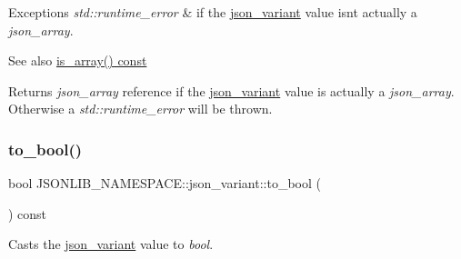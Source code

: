 \begin{DoxyExceptions}{Exceptions}
{\em std\+::runtime\+\_\+error} & if the \hyperlink{classJSONLIB__NAMESPACE_1_1json__variant}{json\+\_\+variant} value isn\textquotesingle{}t actually a {\itshape json\+\_\+array}. \\
\hline
\end{DoxyExceptions}
\begin{DoxySeeAlso}{See also}
\hyperlink{classJSONLIB__NAMESPACE_1_1json__variant_a72349dff71a411ac24eea6d943772df7}{is\+\_\+array() const} 
\end{DoxySeeAlso}
\begin{DoxyReturn}{Returns}
{\itshape json\+\_\+array} reference if the \hyperlink{classJSONLIB__NAMESPACE_1_1json__variant}{json\+\_\+variant} value is actually a {\itshape json\+\_\+array}. Otherwise a {\itshape std\+::runtime\+\_\+error} will be thrown. 
\end{DoxyReturn}
\mbox{\label{classJSONLIB__NAMESPACE_1_1json__variant_a7a675f60b84c0f8e6ee30aba7cb0b72c}} 
\subsubsection{\texorpdfstring{to\+\_\+bool()}{to\_bool()}}
{\footnotesize\ttfamily bool J\+S\+O\+N\+L\+I\+B\+\_\+\+N\+A\+M\+E\+S\+P\+A\+C\+E\+::json\+\_\+variant\+::to\+\_\+bool (\begin{DoxyParamCaption}{ }\end{DoxyParamCaption}) const}



Casts the \hyperlink{classJSONLIB__NAMESPACE_1_1json__variant}{json\+\_\+variant} value to {\itshape bool}. 


